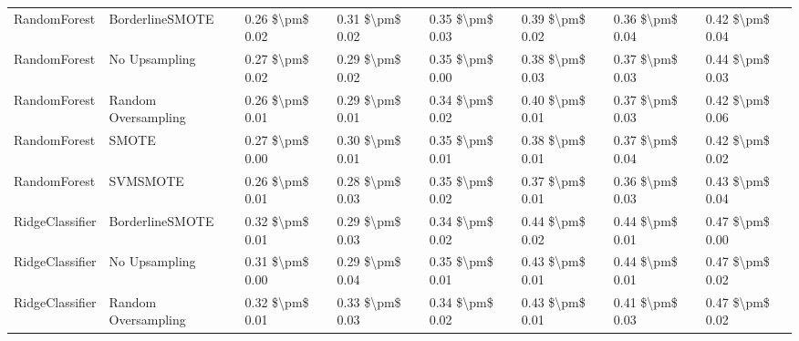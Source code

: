\begin{tabular}{llllllll}
                   RandomForest &               BorderlineSMOTE & 0.26 \$\textbackslash pm\$ 0.02 &           0.31 \$\textbackslash pm\$ 0.02 &       0.35 \$\textbackslash pm\$ 0.03 &        0.39 \$\textbackslash pm\$ 0.02 &                         0.36 \$\textbackslash pm\$ 0.04 &     0.42 \$\textbackslash pm\$ 0.04 \\
                   RandomForest &                 No Upsampling & 0.27 \$\textbackslash pm\$ 0.02 &           0.29 \$\textbackslash pm\$ 0.02 &       0.35 \$\textbackslash pm\$ 0.00 &        0.38 \$\textbackslash pm\$ 0.03 &                         0.37 \$\textbackslash pm\$ 0.03 &     0.44 \$\textbackslash pm\$ 0.03 \\
                   RandomForest &           Random Oversampling & 0.26 \$\textbackslash pm\$ 0.01 &           0.29 \$\textbackslash pm\$ 0.01 &       0.34 \$\textbackslash pm\$ 0.02 &        0.40 \$\textbackslash pm\$ 0.01 &                         0.37 \$\textbackslash pm\$ 0.03 &     0.42 \$\textbackslash pm\$ 0.06 \\
                   RandomForest &                         SMOTE & 0.27 \$\textbackslash pm\$ 0.00 &           0.30 \$\textbackslash pm\$ 0.01 &       0.35 \$\textbackslash pm\$ 0.01 &        0.38 \$\textbackslash pm\$ 0.01 &                         0.37 \$\textbackslash pm\$ 0.04 &     0.42 \$\textbackslash pm\$ 0.02 \\
                   RandomForest &                      SVMSMOTE & 0.26 \$\textbackslash pm\$ 0.01 &           0.28 \$\textbackslash pm\$ 0.03 &       0.35 \$\textbackslash pm\$ 0.02 &        0.37 \$\textbackslash pm\$ 0.01 &                         0.36 \$\textbackslash pm\$ 0.03 &     0.43 \$\textbackslash pm\$ 0.04 \\
                RidgeClassifier &               BorderlineSMOTE & 0.32 \$\textbackslash pm\$ 0.01 &           0.29 \$\textbackslash pm\$ 0.03 &       0.34 \$\textbackslash pm\$ 0.02 &        0.44 \$\textbackslash pm\$ 0.02 &                         0.44 \$\textbackslash pm\$ 0.01 &     0.47 \$\textbackslash pm\$ 0.00 \\
                RidgeClassifier &                 No Upsampling & 0.31 \$\textbackslash pm\$ 0.00 &           0.29 \$\textbackslash pm\$ 0.04 &       0.35 \$\textbackslash pm\$ 0.01 &        0.43 \$\textbackslash pm\$ 0.01 &                         0.44 \$\textbackslash pm\$ 0.01 &     0.47 \$\textbackslash pm\$ 0.02 \\
                RidgeClassifier &           Random Oversampling & 0.32 \$\textbackslash pm\$ 0.01 &           0.33 \$\textbackslash pm\$ 0.03 &       0.34 \$\textbackslash pm\$ 0.02 &        0.43 \$\textbackslash pm\$ 0.01 &                         0.41 \$\textbackslash pm\$ 0.03 &     0.47 \$\textbackslash pm\$ 0.02 \\

\end{tabular}
